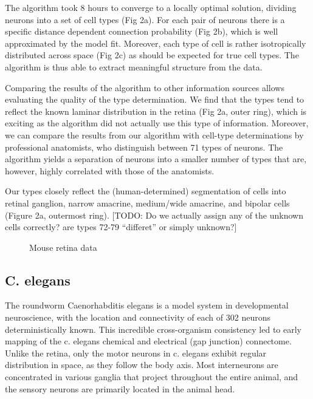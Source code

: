 \documentclass{article}
\begin{document}
The algorithm took 8 hours to converge to a locally optimal solution, dividing neurons into a set of cell types (Fig 2a). For each pair of neurons there is a specific distance dependent connection probability (Fig 2b), which is well approximated by the model fit. Moreover, each type of cell is rather isotropically distributed across space (Fig 2c) as should be expected for true cell types. The algorithm is thus able to extract meaningful structure from the data.

Comparing the results of the algorithm to other information sources allows evaluating the quality of the type determination. We find that the types tend to reflect the known laminar distribution in the retina (Fig 2a, outer ring), which is exciting as the algorithm did not actually use this type of information. Moreover, we can compare the results from our algorithm with cell-type determinations by professional anatomists, who distinguish between 71 types of neurons. The algorithm yields a separation of neurons into a smaller number of types that are, however, highly correlated with those of the anatomists. 

Our types closely reflect the (human-determined) segmentation of cells into retinal ganglion, narrow amacrine, medium/wide amacrine, and bipolar cells (Figure 2a, outermost ring). [TODO: Do we actually assign any of the unknown cells correctly? are types 72-79 “differet” or simply unknown?]





\begin{figure}
  \centering 
  \caption{Mouse retina data}
\end{figure}

\subsection{C. elegans}

The roundworm Caenorhabditis elegans is a model system in developmental neuroscience, with the location and connectivity of each of 302 neurons deterministically known. This incredible cross-organism consistency led to early mapping of the c. elegans chemical and electrical (gap junction) connectome. Unlike the retina, only the motor neurons in c. elegans exhibit regular distribution in space, as they follow the body axis. Most interneurons are concentrated in various ganglia that project throughout the entire animal, and the sensory neurons are primarily located in the animal head. 
\end{document}
